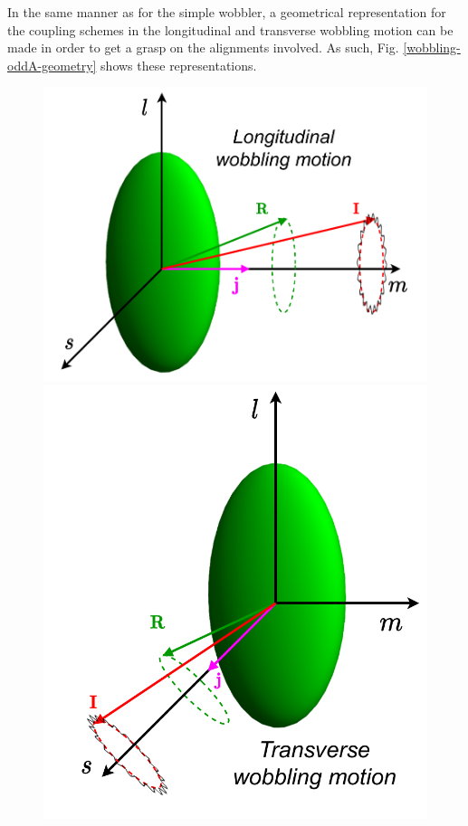 In the same manner as for the simple wobbler, a geometrical representation for the coupling schemes in the longitudinal and transverse wobbling motion can be made in order to get a grasp on the alignments involved. As such, Fig. \ref{wobbling-oddA-geometry} shows these representations.

\begin{figure}
    \centering
    \includegraphics[scale=0.7]{Chapters/Figures/longitudinal_wobbler-schematic.pdf}
    \includegraphics[scale=0.7]{Chapters/Figures/transverse_wobbler-schematic.pdf}

\end{figure}
